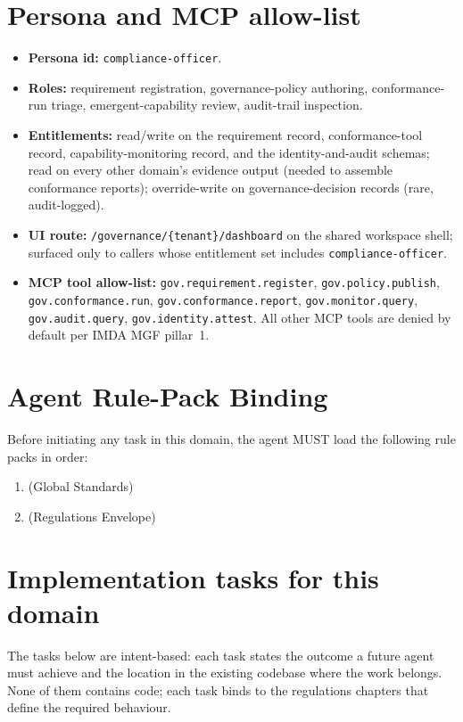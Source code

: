 \section{Persona and MCP allow-list}
\label{sec:agent-persona}
\begin{itemize}
  \item \textbf{Persona id:} \texttt{compliance-officer}.
  \item \textbf{Roles:} requirement registration, governance-policy
    authoring, conformance-run triage, emergent-capability review,
    audit-trail inspection.
  \item \textbf{Entitlements:} read/write on the requirement record,
    conformance-tool record, capability-monitoring record, and the
    identity-and-audit schemas; read on every other domain's
    evidence output (needed to assemble conformance reports);
    override-write on governance-decision records (rare, audit-logged).
  \item \textbf{UI route:} \texttt{/governance/\{tenant\}/dashboard}
    on the shared workspace shell; surfaced only to callers whose
    entitlement set includes \texttt{compliance-officer}.
  \item \textbf{MCP tool allow-list:}
    \texttt{gov.requirement.register}, \texttt{gov.policy.publish},
    \texttt{gov.conformance.run}, \texttt{gov.conformance.report},
    \texttt{gov.monitor.query}, \texttt{gov.audit.query},
    \texttt{gov.identity.attest}. All other MCP tools are denied by
    default per IMDA MGF pillar~1.
\end{itemize}

\section{Agent Rule-Pack Binding}
\label{sec:agent-rule-binding}
Before initiating any task in this domain, the agent MUST load the following rule packs in order:
\begin{enumerate}
  \item {} (Global Standards)
  \item {} (Regulations Envelope)
\end{enumerate}

\section{Implementation tasks for this domain}
\label{sec:agent-tasks}
The tasks below are intent-based: each task states the outcome a
future agent must achieve and the location in the existing codebase
where the work belongs. None of them contains code; each task binds
to the regulations chapters that define the required behaviour.

